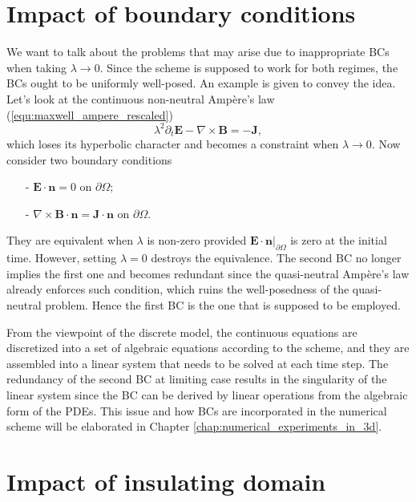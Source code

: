 \documentclass{report}
\begin{document}
\section{Impact of boundary conditions} \label{sec:impact_of_bc}
We want to talk about the problems that may arise due to inappropriate BCs when taking $\lambda \rightarrow 0$. Since the scheme is supposed to work for both regimes, the BCs ought to be uniformly well-posed. An example is given to convey the idea. Let's look at the continuous non-neutral Amp\`{e}re's law (\ref{equ:maxwell_ampere_rescaled})
\begin{equation*}
    \lambda^2 \partial_t \mathbf{E} - \nabla \times \mathbf{B} = - \mathbf{J},
\end{equation*}
which loses its hyperbolic character and becomes a constraint when $\lambda \rightarrow 0$. Now consider two boundary conditions
\begin{itemize}
    \item[-]  $\mathbf{E}\cdot\mathbf{n} = 0$ on $\partial\Omega$;
    \item[-] $\nabla \times \mathbf{B} \cdot\mathbf{n} = \mathbf{J}\cdot\mathbf{n}$ on $\partial\Omega$. 
\end{itemize}
They are equivalent when $\lambda$ is non-zero provided $\mathbf{E}\cdot\mathbf{n}|_{\partial\Omega}$ is zero at the initial time. However, setting $\lambda = 0$ destroys the equivalence. The second BC no longer implies the first one and becomes redundant since the quasi-neutral Amp\`{e}re's law already enforces such condition, which ruins the well-posedness of the quasi-neutral problem. Hence the first BC is the one that is supposed to be employed.

From the viewpoint of the discrete model, the continuous equations are discretized into a set of algebraic equations according to the scheme, and they are assembled into a linear system that needs to be solved at each time step. The redundancy of the second BC at limiting case results in the singularity of the linear system since the BC can be derived by linear operations from the algebraic form of the PDEs. This issue and how BCs are incorporated in the numerical scheme will be elaborated in Chapter \ref{chap:numerical_experiments_in_3d}.

\section{Impact of insulating domain} \label{sec:impact_insulating_domain}
\end{document}
